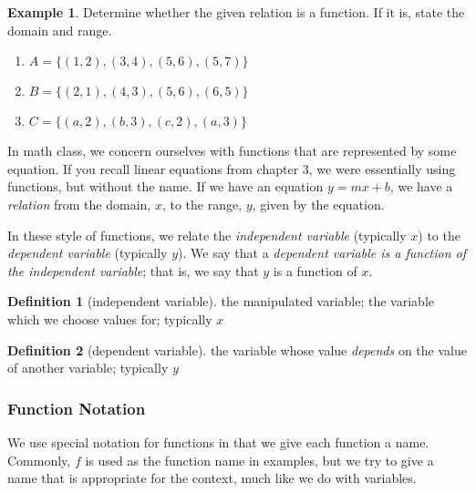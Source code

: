 \documentclass[addpoints,12pt]{exam}
\theoremstyle{definition}
\newtheorem{example}{Example}[subsection]
\newtheorem{definition}{Definition}[subsection]
\begin{document}
\newpage

\begin{example}
Determine whether the given relation is a function. If it is, state the domain and range.
\begin{enumerate}
\item $A = \{(1,2),(3,4),(5,6),(5,7)\}$
\vspace{.5in}
\item $B = \{(2,1),(4,3),(5,6),(6,5)\}$
\vspace{.5in}
\item $C = \{(a,2),(b,3),(c,2),(a,3)\}$
\vspace{.5in}
\end{enumerate}
\end{example}

In math class, we concern ourselves with functions that are represented by some equation. If you recall linear equations from chapter 3, we were essentially using functions, but without the name. If we have an equation $y = mx + b$, we have a \emph{relation} from the domain, $x$, to the range, $y$, given by the equation.

\vspace{.2in}

In these style of functions, we relate the \emph{independent variable} (typically $x$) to the \emph{dependent variable} (typically $y$). We say that a \emph{dependent variable is a function of the independent variable}; that is, we say that $y$ is a function of $x$.
\vspace{.2in}
\begin{definition}[independent variable]
the manipulated variable; the variable which we choose values for; typically $x$
\end{definition}

\begin{definition}[dependent variable]
the variable whose value \emph{depends} on the value of another variable; typically $y$
\end{definition}

\newpage

\subsubsection*{Function Notation}

We use special notation for functions in that we give each function a name. Commonly, $f$ is used as the function name in examples, but we try to give a name that is appropriate for the context, much like we do with variables.
\end{document}
